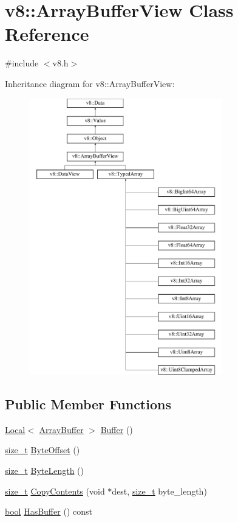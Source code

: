 \hypertarget{classv8_1_1ArrayBufferView}{}\section{v8\+:\+:Array\+Buffer\+View Class Reference}
\label{classv8_1_1ArrayBufferView}


{\ttfamily \#include $<$v8.\+h$>$}

Inheritance diagram for v8\+:\+:Array\+Buffer\+View\+:\begin{figure}[H]
\begin{center}
\leavevmode
\includegraphics[height=12.000000cm]{classv8_1_1ArrayBufferView}
\end{center}
\end{figure}
\subsection*{Public Member Functions}
\begin{DoxyCompactItemize}
\item 
\mbox{\hyperlink{classv8_1_1Local}{Local}}$<$ \mbox{\hyperlink{classv8_1_1ArrayBuffer}{Array\+Buffer}} $>$ \mbox{\hyperlink{classv8_1_1ArrayBufferView_a134c62b37be7a9e8437a56b832f1800a}{Buffer}} ()
\item 
\mbox{\hyperlink{classsize__t}{size\+\_\+t}} \mbox{\hyperlink{classv8_1_1ArrayBufferView_a4739a31269f5ebc5b88a708b9429c688}{Byte\+Offset}} ()
\item 
\mbox{\hyperlink{classsize__t}{size\+\_\+t}} \mbox{\hyperlink{classv8_1_1ArrayBufferView_a9fc7563c97e0b639a6c0a3274995bb3c}{Byte\+Length}} ()
\item 
\mbox{\hyperlink{classsize__t}{size\+\_\+t}} \mbox{\hyperlink{classv8_1_1ArrayBufferView_aa728e762ed43194f3a5e05e792fff64e}{Copy\+Contents}} (void $\ast$dest, \mbox{\hyperlink{classsize__t}{size\+\_\+t}} byte\+\_\+length)
\item 
\mbox{\hyperlink{classbool}{bool}} \mbox{\hyperlink{classv8_1_1ArrayBufferView_ab1f5835c3dea53a625814a8c3ab2e0ae}{Has\+Buffer}} () const
\end{DoxyCompactItemize}
